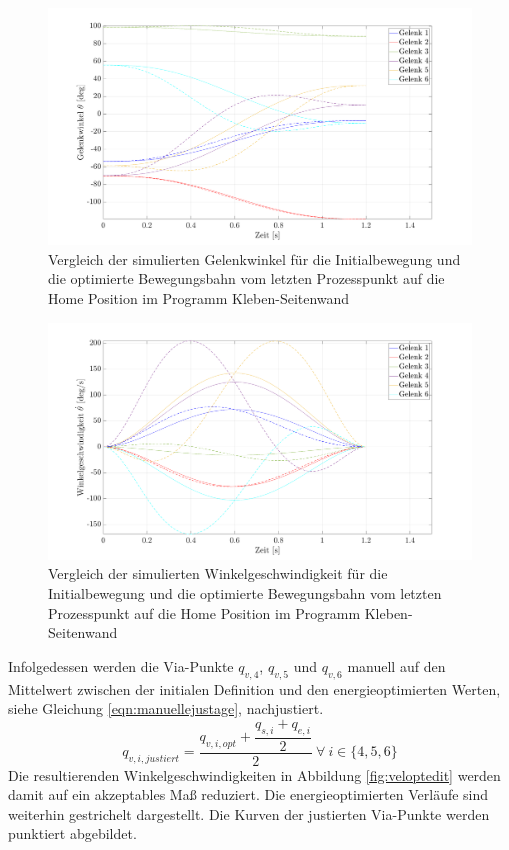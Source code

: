 \begin{figure}[tbph]
	\centering
	\includegraphics[width=1\linewidth]{images/Optimierungsergebnisse_up/posopt}
	\caption{Vergleich der simulierten Gelenkwinkel für die Initialbewegung und die optimierte Bewegungsbahn  vom letzten Prozesspunkt auf die  Home Position im Programm Kleben-Seitenwand}
	\label{fig:posopt}
\end{figure}
%
\begin{figure}[tbph]
	\centering
	\includegraphics[width=1\linewidth]{images/Optimierungsergebnisse_up/velopt}
	\caption{Vergleich der simulierten Winkelgeschwindigkeit für die Initialbewegung und die optimierte Bewegungsbahn vom letzten Prozesspunkt auf die  Home Position im Programm Kleben-Seitenwand}
	\label{fig:velopt}
\end{figure}

Infolgedessen werden die Via-Punkte ${q}_{v,4}$, ${q}_{v,5}$ und ${q}_{v,6}$ manuell auf den Mittelwert zwischen der initialen Definition und den energieoptimierten Werten, siehe Gleichung \ref{eqn:manuellejustage}, nachjustiert.
%
\begin{equation}
	\label{eqn:manuellejustage}
	{q}_{v,i,justiert} = \dfrac{{q}_{v,i,opt} + \dfrac{q_{s,i}+q_{e,i}}{2}}{2}~\forall~ i \in \{4,5,6\}
\end{equation}
%
Die resultierenden Winkelgeschwindigkeiten in Abbildung \ref{fig:veloptedit} 
werden damit auf ein akzeptables Maß reduziert. 
Die energieoptimierten Verläufe sind weiterhin gestrichelt dargestellt. Die Kurven der justierten Via-Punkte werden punktiert abgebildet.

